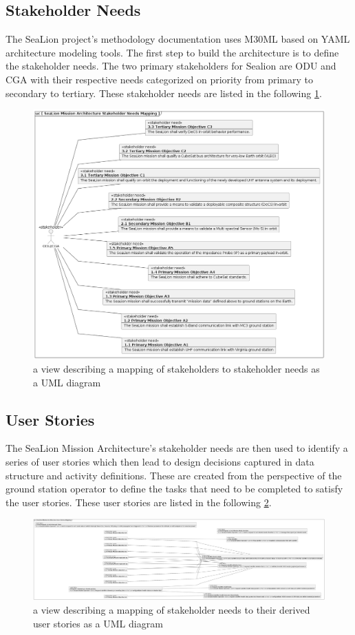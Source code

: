 \documentclass[conf]{new-aiaa}
\begin{document}
\subsection{Stakeholder Needs}

The SeaLion project's methodology documentation uses M30ML based on YAML architecture modeling tools. The first step to build the architecture is to define the stakeholder needs. The two primary stakeholders for Sealion are ODU and CGA with their respective needs categorized on priority from primary to secondary to tertiary. These stakeholder needs are listed in the following \ref{stakeholder-needs-mapping}.

\begin{figure}[hbt!]
    \centering
    \includegraphics[width=.5\textwidth]{stakeholder-needs-mapping}
    \caption{a view describing a mapping of stakeholders to stakeholder needs as a UML diagram}
    \label{stakeholder-needs-mapping}
\end{figure}

\subsection{User Stories}

The SeaLion Mission Architecture's stakeholder needs are then used to identify a series of user stories which then lead to design decisions captured in data structure and activity definitions. These are created from the perspective of the ground station operator to define the tasks that need to be completed to satisfy the user stories. These user stories are listed in the following \ref{user-stories-mapping}.

\begin{figure}[hbt!]
    \centering
    \includegraphics[width=.5\textwidth]{user-stories-mapping}
    \caption{a view describing a mapping of stakeholder needs to their derived user stories as a UML diagram}
    \label{user-stories-mapping}
\end{figure}
\end{document}
